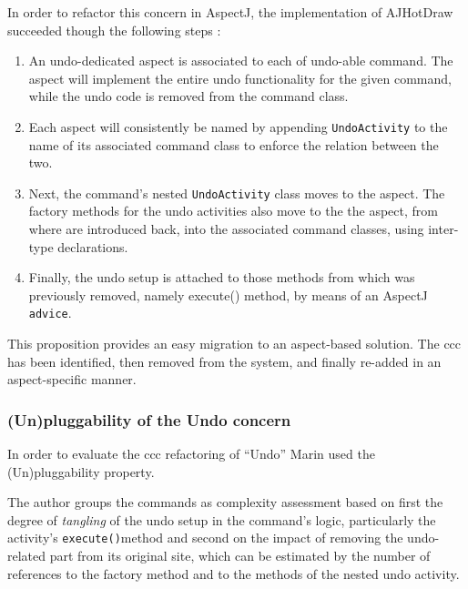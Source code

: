 In order to refactor this concern in AspectJ, the implementation of AJHotDraw succeeded though the following steps \cite{marin2004refactoring}:

\begin{enumerate}

	\item An undo-dedicated aspect is associated to each of undo-able command. 
	The aspect will implement the entire undo functionality for the given command, while the undo code is removed from the command class.

 	\item Each aspect will consistently be named by appending \texttt{UndoActivity} to the name of its associated command class to enforce the relation between the two.

	\item Next, the command's nested \texttt{UndoActivity} class moves to the aspect. 
	The factory methods for the undo activities also move to the the aspect, from where are introduced back, into the associated command classes, using inter-type declarations.

	\item Finally, the undo setup is attached to those methods from which was previously removed, namely execute() method, by means of an AspectJ \texttt{advice}.

\end{enumerate}

This proposition \cite{marin2004refactoring} provides an easy migration to an aspect-based solution. 
The \ac{ccc} has been identified, then removed from the system, and finally re-added in an aspect-specific manner.

\subsubsection{(Un)pluggability of the Undo concern}
In order to evaluate the \ac{ccc} refactoring of ``Undo'' Marin \cite{marin2004refactoring} used the (Un)pluggability property.

The author groups the commands as complexity assessment based on first the degree of \textit{tangling} of the undo setup in the command's logic, particularly the activity's \texttt{execute()}method and second on the impact of removing the undo-related part from its original site, which can be estimated by the number of references to the factory method and to the methods of the nested undo activity.

